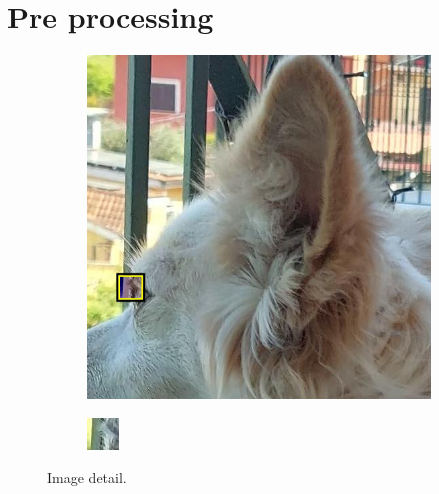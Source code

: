 \section{Pre processing}
\begin{figure}[ht]
    \centering
    \begin{subfigure}{0.4\linewidth}
        \includegraphics[width=\linewidth]{Figures/example_square.png}
    \end{subfigure}
    \hspace{2cm}
    \begin{subfigure}{0.4\linewidth}
        \includegraphics[width=\linewidth]{Figures/example_detail.png}
    \end{subfigure}
    \caption[Pixel grid detail]{Image detail.}
    \label{fig:example_detail}
\end{figure}


